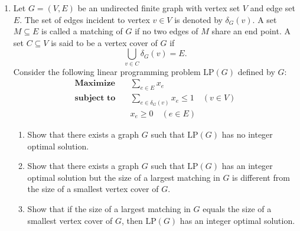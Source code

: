\documentclass{article}
\begin{document}
\begin{enumerate}[label=\fbox{\arabic*}]
  \item Let $G = (V, E)$ be an undirected finite graph with vertex set $V$ and edge set $E$. The set of edges incident to vertex $v \in V$ is denoted by $\delta_G(v)$. A set $M \subseteq E$ is called a matching of $G$ if no two edges of $M$ share an end point. A set $C \subseteq V$ is said to be a vertex cover of $G$ if
        \[
          \bigcup_{v \in C} \delta_G(v) = E.
        \]
        Consider the following linear programming problem $\mathrm{LP}(G)$ defined by $G$:
        \begin{align*}
          \textbf{Maximize} \quad & \sum_{e \in E} x_e \\
          \textbf{subject to} \quad & \sum_{e \in \delta_G(v)} x_e \le 1 \quad (v \in V) \\
          & x_e \ge 0 \quad (e \in E)
        \end{align*}
        \begin{enumerate}[label=\arabic*.]
          \item Show that there exists a graph $G$ such that $\mathrm{LP}(G)$ has no integer optimal solution.
          \item Show that there exists a graph $G$ such that $\mathrm{LP}(G)$ has an integer optimal solution but the size of a largest matching in $G$ is different from the size of a smallest vertex cover of $G$.
          \item Show that if the size of a largest matching in $G$ equals the size of a smallest vertex cover of $G$, then $\mathrm{LP}(G)$ has an integer optimal solution.
        \end{enumerate}


\end{enumerate}
\end{document}
